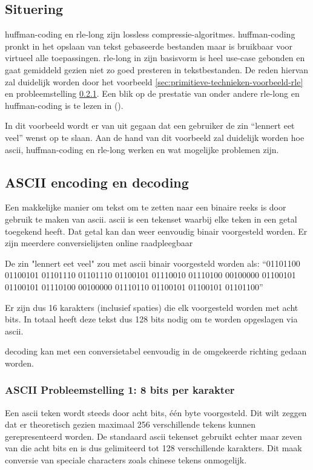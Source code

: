 \subsection{Situering}
\label{sec:primitieve-technieken-voorbeeld-situering}
\Gls{huffman-coding} en \gls{rle-long} zijn \gls{lossless} \glspl{compressie-algoritme}. \Gls{huffman-coding} pronkt in het opslaan van tekst gebaseerde bestanden maar is bruikbaar voor virtueel alle toepassingen. \Gls{rle-long} in zijn basisvorm is heel \gls{use-case} gebonden en gaat gemiddeld gezien niet zo goed presteren in tekstbestanden. De reden hiervan zal duidelijk worden door het voorbeeld \ref{sec:primitieve-technieken-voorbeeld-rle} en probleemstelling \ref{sec:primitieve-technieken-voorbeeld-ascii-probleem-1}. Een blik op de prestatie van onder andere \gls{rle-long} en \gls{huffman-coding} is te lezen in  (\cite{losslessfortextdata}).

In dit voorbeeld wordt er van uit gegaan dat een gebruiker de zin “lennert eet veel” wenst op te slaan. Aan de hand van dit voorbeeld zal duidelijk worden hoe \gls{ascii}, \gls{huffman-coding} en \gls{rle-long} werken en wat mogelijke problemen zijn.

\subsection{ASCII encoding en decoding}
\label{sec:primitieve-technieken-voorbeeld-ascii}
Een makkelijke manier om tekst om te zetten naar een binaire reeks is door gebruik te maken van \gls{ascii}. \Gls{ascii} is een tekenset waarbij elke teken in een getal toegekend heeft. Dat getal kan dan weer eenvoudig binair voorgesteld worden. Er zijn meerdere conversielijsten online raadpleegbaar

De zin "lennert eet veel" zou met \gls{ascii} binair voorgesteld worden als: 
“01101100 01100101 01101110 01101110 01100101 01110010 01110100 00100000 01100101 01100101 01110100 00100000 01110110 01100101 01100101 01101100”

Er zijn dus 16 karakters (inclusief spaties) die elk voorgesteld worden met acht \glspl{bit}. In totaal heeft deze tekst dus 128 \glspl{bit} nodig om te worden opgeslagen via \gls{ascii}.

\Gls{decoding} kan met een conversietabel eenvoudig in de omgekeerde richting gedaan worden. 

\subsubsection{ASCII Probleemstelling 1: 8 bits per karakter}
\label{sec:primitieve-technieken-voorbeeld-ascii-probleem-1}
Een \gls{ascii} teken wordt steeds door acht \glspl{bit}, één \gls{byte} voorgesteld. Dit wilt zeggen dat er theoretisch gezien maximaal 256 verschillende tekens kunnen gerepresenteerd worden. De standaard \gls{ascii} tekenset gebruikt echter maar zeven van die acht \glspl{bit} en is dus gelimiteerd tot 128 verschillende karakters. Dit maak conversie van speciale characters zoals chinese tekens onmogelijk.

